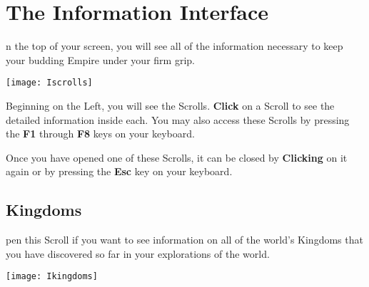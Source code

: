 
\chapter{The Information Interface}


n the top of your screen, you will see all of the information necessary to keep your budding Empire under your firm grip.

\begin{center}
	\texttt{[image: Iscrolls]} %
\end{center}


Beginning on the Left, you will see the Scrolls. \textbf{Click} on a Scroll to see the detailed information inside each. You may also access these Scrolls by pressing the \textbf{F1} through \textbf{F8} keys on your keyboard.

Once you have opened one of these Scrolls, it can be closed by \textbf{Clicking} on it again or by pressing the \textbf{Esc} key on your keyboard.

\section{Kingdoms}


pen this Scroll if you want to see information on all of the world’s Kingdoms that you have discovered so far in your explorations of the world.

\begin{center}
	\texttt{[image: Ikingdoms]} %
\end{center}

